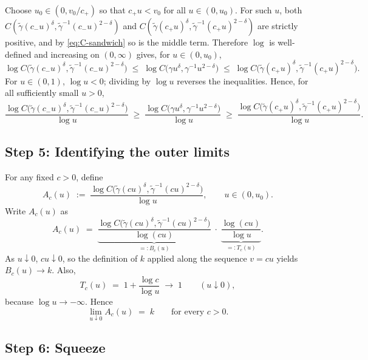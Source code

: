 \documentclass[11pt]{article}
\theoremstyle{definition}
\begin{document}
Choose $u_0\in(0,v_0/c_+)$ so that $c_+ u < v_0$ for all $u\in(0,u_0)$.
For such $u$, both
$C(\tilde\gamma(c_- u)^{\delta},\tilde\gamma^{-1}(c_- u)^{2-\delta})$
and
$C(\tilde\gamma(c_+ u)^{\delta},\tilde\gamma^{-1}(c_+ u)^{2-\delta})$
are strictly positive, and by \eqref{eq:C-sandwich} so is the middle
term. Therefore $\log$ is well-defined and increasing on
$(0,\infty)$ gives, for $u\in(0,u_0)$,
\[
\log C\!\bigl(\tilde\gamma(c_- u)^{\delta},\tilde\gamma^{-1}(c_- u)^{2-\delta}\bigr)
\;\le\;
\log C\!\bigl(\gamma u^{\delta},\gamma^{-1}u^{2-\delta}\bigr)
\;\le\;
\log C\!\bigl(\tilde\gamma(c_+ u)^{\delta},\tilde\gamma^{-1}(c_+ u)^{2-\delta}\bigr).
\]
For $u\in(0,1)$, $\log u<0$; dividing by $\log u$ reverses the
inequalities. Hence, for all sufficiently small $u>0$,
\begin{equation}\label{eq:log-sandwich}
\frac{\log C\!\bigl(\tilde\gamma(c_- u)^{\delta},\tilde\gamma^{-1}(c_- u)^{2-\delta}\bigr)}{\log u}
\;\ge\;
\frac{\log C\!\bigl(\gamma u^{\delta},\gamma^{-1}u^{2-\delta}\bigr)}{\log u}
\;\ge\;
\frac{\log C\!\bigl(\tilde\gamma(c_+ u)^{\delta},\tilde\gamma^{-1}(c_+ u)^{2-\delta}\bigr)}{\log u}.
\end{equation}

\subsection*{Step 5: Identifying the outer limits}

For any fixed $c>0$, define
\[
A_c(u) \;:=\;
\frac{\log C\!\bigl(\tilde\gamma(c u)^{\delta},\tilde\gamma^{-1}(c u)^{2-\delta}\bigr)}{\log u},
\qquad u\in(0,u_0).
\]
Write $A_c(u)$ as
\[
A_c(u) \;=\;
\underbrace{\frac{\log C\!\bigl(\tilde\gamma(c u)^{\delta},\tilde\gamma^{-1}(c u)^{2-\delta}\bigr)}{\log(c u)}}_{=:B_c(u)}
\;\cdot\;
\underbrace{\frac{\log(c u)}{\log u}}_{=:T_c(u)}.
\]
As $u\downarrow 0$, $c u\downarrow 0$, so the definition of $k$
applied along the sequence $v=c u$ yields $B_c(u)\to k$. Also,
\[
T_c(u) \;=\; 1 + \frac{\log c}{\log u} \;\longrightarrow\; 1
\qquad (u\downarrow 0),
\]
because $\log u\to-\infty$. Hence
\begin{equation}\label{eq:Ac-conv}
\lim_{u\downarrow 0} A_c(u) \;=\; k \qquad \text{for every } c>0.
\end{equation}

\subsection*{Step 6: Squeeze}
\end{document}
